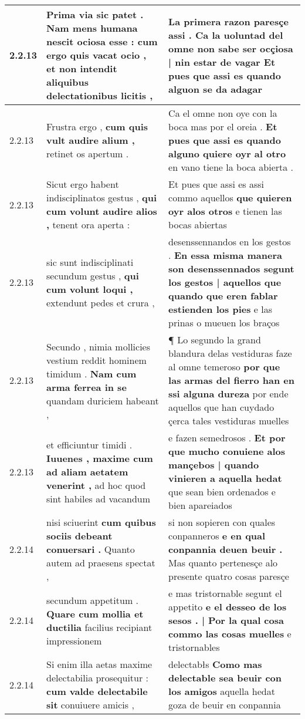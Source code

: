 \begin{tabular}{|p{1cm}|p{6.5cm}|p{6.5cm}|}
2.2.13 & Prima via sic patet . \textbf{ Nam mens humana nescit ociosa esse : cum ergo quis vacat ocio , } et non intendit aliquibus delectationibus licitis , & La primera razon paresçe assi . \textbf{ Ca la uoluntad del omne non sabe ser ocçiosa | nin estar de vagar } Et pues que assi es quando alguon se da adagar \\\hline
2.2.13 & Frustra ergo , \textbf{ cum quis vult audire alium , } retinet os apertum . & Ca el omne non oye con la boca mas por el oreia . \textbf{ Et pues que assi es quando alguno quiere oyr al otro } en vano tiene la boca abierta . \\\hline
2.2.13 & Sicut ergo habent indisciplinatos gestus , \textbf{ qui cum volunt audire alios , } tenent ora aperta : & Et pues que assi es assi commo aquellos \textbf{ que quieren oyr alos otros } e tienen las bocas abiertas \\\hline
2.2.13 & sic sunt indisciplinati secundum gestus , \textbf{ qui cum volunt loqui , } extendunt pedes et crura , & desenssennandos en los gestos . \textbf{ En essa misma manera son desenssennados segunt los gestos | aquellos que quando que eren fablar estienden los pies } e las prinas o mueuen los braços \\\hline
2.2.13 & Secundo , nimia mollicies vestium reddit hominem timidum . \textbf{ Nam cum arma ferrea in se } quandam duriciem habeant , & ¶ Lo segundo la grand blandura delas vestiduras faze al omne temeroso \textbf{ por que las armas del fierro han en ssi alguna dureza } por ende aquellos que han cuydado çerca tales vestiduras muelles \\\hline
2.2.13 & et efficiuntur timidi . \textbf{ Iuuenes , maxime cum ad aliam aetatem venerint , } ad hoc quod sint habiles ad vacandum & e fazen semedrosos . \textbf{ Et por que mucho conuiene alos mançebos | quando vinieren a aquella hedat } que sean bien ordenados e bien apareiados \\\hline
2.2.14 & nisi sciuerint \textbf{ cum quibus sociis debeant conuersari . } Quanto autem ad praesens spectat , & si non sopieren con quales conpanneros \textbf{ e en qual conpannia deuen beuir . } Mas quanto pertenesçe alo presente quatro cosas paresçe \\\hline
2.2.14 & secundum appetitum . \textbf{ Quare cum mollia et ductilia } facilius recipiant impressionem & e mas tristornable segunt el appetito \textbf{ e el desseo de los sesos . | Por la qual cosa commo las cosas muelles } e tristornables \\\hline
2.2.14 & Si enim illa aetas maxime delectabilia prosequitur : \textbf{ cum valde delectabile sit } conuiuere amicis , & delectabłs \textbf{ Como mas delectable sea beuir con los amigos } aquella hedat goza de beuir en conpannia \\\hline

\end{tabular}
